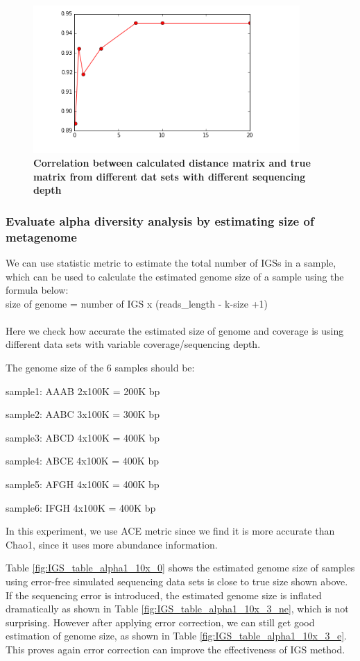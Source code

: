 \documentclass[12pt]{report}
\begin{document}
\begin{figure}[!ht]
 \centerline{\includegraphics[width=4in]{./figures/IGS_correlation_coverage.png}}
\caption{\bf Correlation between calculated distance matrix and true matrix from different dat sets with different sequencing depth}
\label{fig:IGS_correlation_coverage}
\end{figure}


\subsubsection{Evaluate alpha diversity analysis by estimating size of metagenome}

We can use statistic metric to estimate the total number of IGSs in a sample, which can be used to calculate the estimated genome size of a sample using the formula below:
\\
size of genome = number of IGS x (reads\_length - k-size +1)\\
\\
Here we check how accurate the estimated size of genome and coverage is using different data sets with variable coverage/sequencing depth.

The genome size of the 6 samples should be:

sample1: AAAB 2x100K = 200K bp

sample2: AABC 3x100K = 300K bp

sample3: ABCD 4x100K = 400K bp

sample4: ABCE 4x100K = 400K bp

sample5: AFGH 4x100K = 400K bp

sample6: IFGH 4x100K = 400K bp

In this experiment, we use ACE metric since we find it is more accurate than Chao1, since it uses more abundance information.

Table \ref{fig:IGS_table_alpha1_10x_0} shows the estimated genome size of samples using error-free simulated sequencing data sets
is close to true size shown above. If the sequencing error is introduced, the estimated genome size is inflated dramatically as shown in Table \ref{fig:IGS_table_alpha1_10x_3_ne}, which is 
not surprising. However after applying error correction, we can still get good estimation of genome size, as shown in Table \ref{fig:IGS_table_alpha1_10x_3_e}.
This proves again error correction can improve the effectiveness of IGS method.
\end{document}
